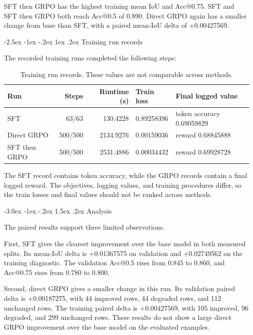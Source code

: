 \documentclass[11pt]{article}
\makeatletter
\renewcommand{\section}{\@startsection{section}{1}{\z@}%
  {-3.0ex \@plus -1ex \@minus -.2ex}%
  {1.5ex \@plus .2ex}%
  {\normalfont\normalsize\bfseries}}
\renewcommand{\subsection}{\@startsection{subsection}{2}{\z@}%
  {-2.5ex \@plus -1ex \@minus -.2ex}%
  {1ex \@plus .2ex}%
  {\normalfont\normalsize\bfseries}}
\makeatother
\begin{document}
SFT then GRPO has the highest training mean IoU and Acc@0.75. SFT and SFT
then GRPO both reach Acc@0.5 of 0.890. Direct GRPO again has a smaller change
from base than SFT, with a paired mean-IoU delta of +0.00427569.

\subsection{Training run records}

The recorded training runs completed the following steps:

\begin{table}[h]
\raggedright
\caption{Training run records. These values are not comparable across methods.}
\label{tab:training-runs}
\begin{tabular}{lrrll}
\hline
Run & Steps & Runtime (s) & Train loss & Final logged value \\
\hline
SFT & 63/63 & 130.4228 & 0.89258396 & token accuracy 0.69059829 \\
Direct GRPO & 500/500 & 2134.9276 & 0.00159036 & reward 0.68845888 \\
SFT then GRPO & 500/500 & 2531.4886 & 0.00034432 & reward 0.69928728 \\
\hline
\end{tabular}
\end{table}

The SFT record contains token accuracy, while the GRPO records contain a final
logged reward. The objectives, logging values, and training procedures differ,
so the train losses and final values should not be ranked across methods.

\section{Analysis}

The paired results support three limited observations.

First, SFT gives the clearest improvement over the base model in both measured
splits. Its mean-IoU delta is +0.01367575 on validation and +0.02749562 on the
training diagnostic. The validation Acc@0.5 rises from 0.845 to 0.860, and
Acc@0.75 rises from 0.780 to 0.800.

Second, direct GRPO gives a smaller change in this run. Its validation paired
delta is +0.00187275, with 44 improved rows, 44 degraded rows, and 112
unchanged rows. The training paired delta is +0.00427569, with 105 improved,
96 degraded, and 299 unchanged rows. These results do not show a large direct
GRPO improvement over the base model on the evaluated examples.
\end{document}
